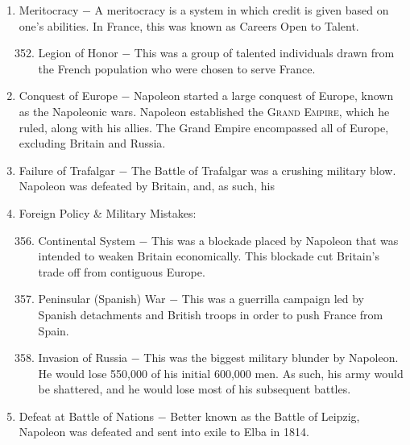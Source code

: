 \documentclass[12pt]{article}
\begin{document}
\begin{enumerate}
\begin{enumerate}[label=\arabic{*}.]
\end{enumerate}
\setcounter{enumi}{350}

\item Meritocracy $-$ A meritocracy is a system in which credit is given based on one's abilities. In France, this was known as Careers Open to Talent.

\begin{enumerate}[label=\arabic{*}.]
\setcounter{enumii}{351}

\item Legion of Honor $-$ This was a group of talented individuals drawn from the French population who were chosen to serve France.

\end{enumerate}
\setcounter{enumi}{352}

\item Conquest of Europe $-$ Napoleon started a large conquest of Europe, known as the Napoleonic wars. Napoleon established the \textsc{Grand Empire}, which he ruled, along with his allies. The Grand Empire encompassed all of Europe, excluding Britain and Russia. 

\item Failure of Trafalgar $-$ The Battle of Trafalgar was a crushing military blow. Napoleon was defeated by Britain, and, as such, his 

\item Foreign Policy \& Military Mistakes:

\begin{enumerate}[label=\arabic{*}.]
\setcounter{enumii}{355}

\item Continental System $-$ This was a blockade placed by Napoleon that was intended to weaken Britain economically. This blockade cut Britain's trade off from contiguous Europe.

\item Peninsular (Spanish) War $-$ This was a guerrilla campaign led by Spanish detachments and British troops in order to push France from Spain.

\item Invasion of Russia $-$ This was the biggest military blunder by Napoleon. He would lose 550,000 of his initial 600,000 men. As such, his army would be shattered, and he would lose most of his subsequent battles.

\end{enumerate}
\setcounter{enumi}{358}

\item Defeat at Battle of Nations $-$ Better known as the Battle of Leipzig, Napoleon was defeated and sent into exile to Elba in 1814.


\end{enumerate}
\end{document}
